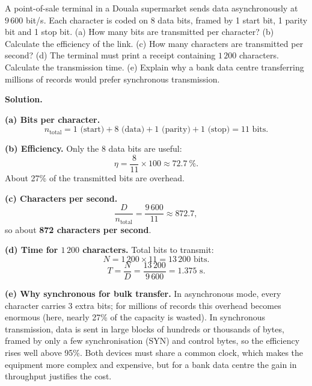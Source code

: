 \documentclass[11pt]{article}
\begin{document}
\begin{experience}
A point-of-sale terminal in a Douala supermarket sends data asynchronously at $9\,600$ bit/s. Each character is coded on 8 data bits, framed by 1 start bit, 1 parity bit and 1 stop bit. (a) How many bits are transmitted per character? (b) Calculate the efficiency of the link. (c) How many characters are transmitted per second? (d) The terminal must print a receipt containing $1\,200$ characters. Calculate the transmission time. (e) Explain why a bank data centre transferring millions of records would prefer synchronous transmission.
\end{experience}

\begin{exoresolu}
\textbf{Solution.}

\textbf{(a) Bits per character.}
\[ n_{\text{total}} = 1 \text{ (start)} + 8 \text{ (data)} + 1 \text{ (parity)} + 1 \text{ (stop)} = 11 \text{ bits}. \]

\textbf{(b) Efficiency.} Only the 8 data bits are useful:
\[ \eta = \frac{8}{11} \times 100 \approx 72.7\ \%. \]
About 27\% of the transmitted bits are overhead.

\textbf{(c) Characters per second.}
\[ \frac{D}{n_{\text{total}}} = \frac{9\,600}{11} \approx 872.7, \]
so about \textbf{872 characters per second}.

\textbf{(d) Time for $1\,200$ characters.} Total bits to transmit:
\[ N = 1\,200 \times 11 = 13\,200 \text{ bits}. \]
\[ T = \frac{N}{D} = \frac{13\,200}{9\,600} = 1.375 \text{ s}. \]

\textbf{(e) Why synchronous for bulk transfer.} In asynchronous mode, every character carries 3 extra bits; for millions of records this overhead becomes enormous (here, nearly 27\% of the capacity is wasted). In synchronous transmission, data is sent in large blocks of hundreds or thousands of bytes, framed by only a few synchronisation (SYN) and control bytes, so the efficiency rises well above 95\%. Both devices must share a common clock, which makes the equipment more complex and expensive, but for a bank data centre the gain in throughput justifies the cost.
\end{exoresolu}
\end{document}

